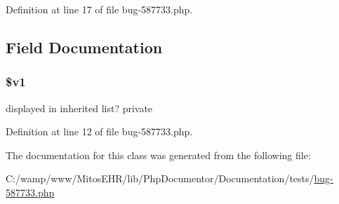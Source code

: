 \-Definition at line 17 of file bug-\/587733.\-php.




\subsection{\-Field \-Documentation}
\hypertarget{classparent__b587733_a105748f11603b5857a25756c98183d4b}{
\subsubsection[{\$v1}]{\setlength{\rightskip}{0pt plus 5cm}\$v1}}\label{classparent__b587733_a105748f11603b5857a25756c98183d4b}
displayed in inherited list?  private 

\-Definition at line 12 of file bug-\/587733.\-php.



\-The documentation for this class was generated from the following file\-:\begin{DoxyCompactItemize}
\item 
\-C\-:/wamp/www/\-Mitos\-E\-H\-R/lib/\-Php\-Documentor/\-Documentation/tests/\hyperlink{bug-587733_8php}{bug-\/587733.\-php}\end{DoxyCompactItemize}
